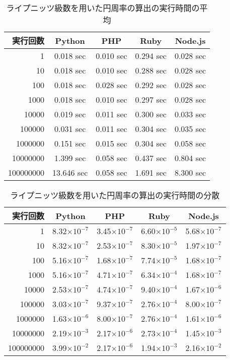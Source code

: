 \begin{table}[tbp]
\centering
\caption{ライプニッツ級数を用いた円周率の算出の実行時間の平均}
\label{table:p-average}
\begin{tabular}{|r||c|c|c|c|}
\hline
実行回数	&Python	&PHP	&Ruby	&Node.js\\ \hline \hline
1   	    &0.018 sec	&0.010 sec	&0.294 sec	&0.028 sec\\ \hline
10	        &0.018 sec	&0.010 sec	&0.288 sec	&0.028 sec\\ \hline
100	        &0.018 sec	&0.028 sec	&0.292 sec	&0.028 sec\\ \hline
1000	    &0.018 sec	&0.010 sec	&0.297 sec	&0.028 sec\\ \hline
10000	    &0.019 sec	&0.011 sec	&0.300 sec	&0.033 sec\\ \hline
100000  	&0.031 sec	&0.011 sec	&0.304 sec	&0.035 sec\\ \hline
1000000	    &0.151 sec	&0.015 sec	&0.304 sec	&0.058 sec\\ \hline
10000000	&1.399 sec	&0.058 sec	&0.437 sec	&0.804 sec\\ \hline
100000000	&13.646 sec	&0.058 sec	&1.691 sec	&8.300 sec\\ \hline
\end{tabular}
\end{table}

\begin{table}[tbp]
\centering
\caption{ライプニッツ級数を用いた円周率の算出の実行時間の分散}
\label{table:p-dispersion}
\begin{tabular}{|r||c|c|c|c|}
\hline
実行回数	&Python	&PHP	&Ruby	&Node.js\\ \hline \hline
1	    	&8.32$\times 10^{-7}$	&3.45$\times 10^{-7}$	&6.60$\times 10^{-5}$	&5.68$\times 10^{-7}$\\ \hline
10	    	&8.32$\times 10^{-7}$	&2.53$\times 10^{-7}$	&8.30$\times 10^{-5}$	&1.97$\times 10^{-7}$\\ \hline
100	    	&5.16$\times 10^{-7}$	&1.68$\times 10^{-7}$	&7.74$\times 10^{-5}$	&1.68$\times 10^{-7}$\\ \hline
1000		&5.16$\times 10^{-7}$	&4.71$\times 10^{-7}$	&6.34$\times 10^{-4}$	&1.68$\times 10^{-7}$\\ \hline
10000		&2.53$\times 10^{-7}$	&4.74$\times 10^{-7}$	&9.40$\times 10^{-4}$	&1.67$\times 10^{-6}$\\ \hline
100000		&3.03$\times 10^{-7}$	&9.37$\times 10^{-7}$	&2.76$\times 10^{-4}$	&8.00$\times 10^{-7}$\\ \hline
1000000		&1.63$\times 10^{-6}$	&8.00$\times 10^{-7}$	&2.76$\times 10^{-4}$	&1.61$\times 10^{-6}$\\ \hline
10000000	&2.19$\times 10^{-3}$	&2.17$\times 10^{-6}$	&2.73$\times 10^{-4}$	&1.45$\times 10^{-3}$\\ \hline
100000000	&3.99$\times 10^{-2}$	&2.17$\times 10^{-6}$	&1.94$\times 10^{-3}$	&2.16$\times 10^{-2}$\\ \hline
\end{tabular}
\end{table}

